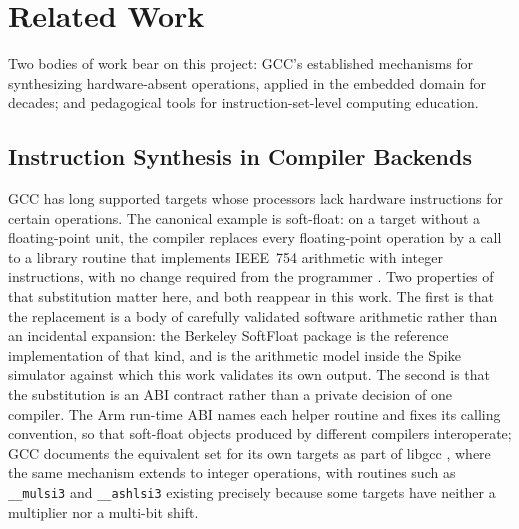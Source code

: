 \chapter{Related Work} \label{cap:related-work}

Two bodies of work bear on this project: GCC's established mechanisms for synthesizing
hardware-absent operations, applied in the embedded domain for decades; and pedagogical tools for
instruction-set-level computing education.

\section{Instruction Synthesis in Compiler Backends}

GCC has long supported targets whose processors lack hardware instructions for certain operations. The
canonical example is soft-float: on a target without a floating-point unit, the compiler replaces every
floating-point operation by a call to a library routine that implements IEEE~754 arithmetic with
integer instructions, with no change required from the programmer \cite{gcc-internals}. Two properties
of that substitution matter here, and both reappear in this work. The first is that the replacement is
a body of carefully validated software arithmetic rather than an incidental expansion: the Berkeley
SoftFloat package \cite{softfloat} is the reference implementation of that kind, and is the arithmetic
model inside the Spike simulator against which this work validates its own output. The second is that
the substitution is an ABI contract rather than a private decision of one compiler. The Arm run-time
ABI \cite{arm-rtabi} names each helper routine and fixes its calling convention, so that soft-float
objects produced by different compilers interoperate; GCC documents the equivalent set for its own
targets as part of libgcc \cite{gcc-internals}, where the same mechanism extends to integer operations,
with routines such as \texttt{\_\_mulsi3} and \texttt{\_\_ashlsi3} existing precisely because some
targets have neither a multiplier nor a multi-bit shift.

